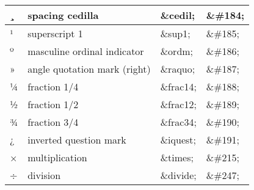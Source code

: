 \begin{longtable}{|p{60pt}|p{120pt}|p{60pt}|p{60pt}|}
\hline
¸		&spacing cedilla			&\&cedil;		&\&\#184;\\
\hline
¹		&superscript 1			&\&sup1;		&\&\#185;\\
\hline
º		&masculine ordinal indicator	&\&ordm;	&\&\#186;\\
\hline
»		&angle quotation mark (right)&\&raquo;	&\&\#187;\\
\hline
¼		&fraction 1/4				&\&frac14;	&\&\#188;\\
\hline
½		&fraction 1/2				&\&frac12;	&\&\#189;\\
\hline
¾		&fraction 3/4				&\&frac34;	&\&\#190;\\
\hline
¿		&inverted question mark	&\&iquest;	&\&\#191;\\
\hline
×		&multiplication			&\&times;	&\&\#215;\\
\hline
÷		&division					&\&divide;	&\&\#247;\\
\hline

\end{longtable}


